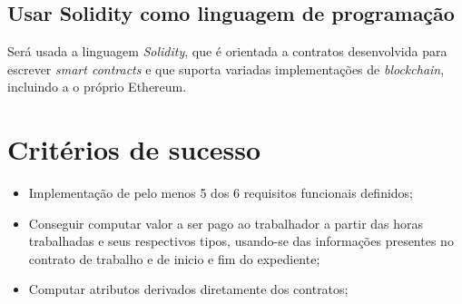 \documentclass{article}
\begin{document}
\subsection{Usar Solidity como linguagem de programação}
Será usada a linguagem \textit{Solidity}, que é orientada a contratos desenvolvida para
escrever \textit{smart contracts} e que suporta variadas implementações de \textit{blockchain}, incluindo a o próprio Ethereum.

\section{Critérios de sucesso}
\begin{itemize}
    \item Implementação de pelo menos 5 dos 6 requisitos funcionais definidos;
    \item Conseguir computar valor a ser pago ao trabalhador a partir das horas
      trabalhadas e seus respectivos tipos, usando-se das informações presentes
      no contrato de trabalho e de inicio e fim do expediente;
    \item Computar atributos derivados diretamente dos contratos;
\end{itemize}
\end{document}
